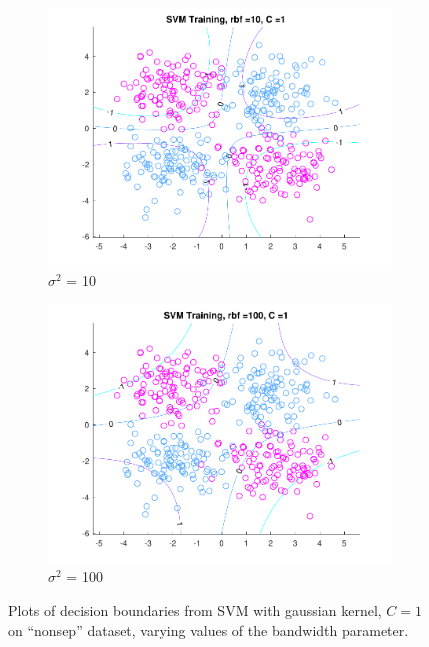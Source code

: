 \begin{figure}[h!]
\begin{subfigure}[b]{0.22\textwidth}
	\includegraphics[scale=0.4]{figures/hw2_2_nonsep_rbf_10_a_1.pdf}
	\caption{$\sigma^2$ = 10}\label{fig:svm_data_stdev4a}
    \end{subfigure} 
    \quad
    \begin{subfigure}[b]{0.22\textwidth}
	\includegraphics[scale=0.4]{figures/hw2_2_nonsep_rbf_100_a_1.pdf}
	\caption{$\sigma^2$ = 100}\label{fig:svm_data_nonsep_a}
    \end{subfigure}  
    \caption{Plots of decision boundaries from SVM with gaussian kernel, $C=1$ on ``nonsep'' dataset, varying values of the bandwidth parameter.}  \label{fig:SVM_kernel_plots}  
\end{figure}

